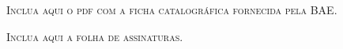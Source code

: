  \begin{fichacatalografica}
    \vspace*{\fill}
    \begin{center}
        \textsc{Inclua aqui o pdf com a ficha catalogr\'{a}fica fornecida pela BAE.}
    \end{center}
    \vspace*{\fill}
 \end{fichacatalografica}




\newpage
\vspace*{\fill}
\begin{center}
    \textsc{Inclua aqui a folha de assinaturas.}
\end{center}
\vspace*{\fill}
\newpage
%	
\cleardoublepage



